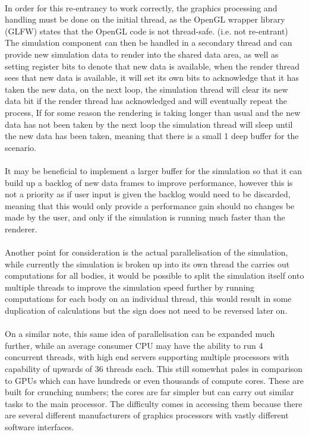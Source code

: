 \paragraph{}
In order for this re-entrancy to work correctly, the graphics processing and handling must be done on the initial thread, as the OpenGL wrapper library (GLFW) states that the OpenGL code is not thread-safe. (i.e. not re-entrant) The simulation component can then be handled in a secondary thread and can provide new simulation data to render into the shared data area, as well as setting register bits to denote that new data is available, when the render thread sees that new data is available, it will set its own bits to acknowledge that it has taken the new data, on the next loop, the simulation thread will clear its new data bit if the render thread has acknowledged and will eventually repeat the process, If for some reason the rendering is taking longer than usual and the new data has not been taken by the next loop the simulation thread will sleep until the new data has been taken, meaning that there is a small 1 deep buffer for the scenario.

\paragraph{}
It may be beneficial to implement a larger buffer for the simulation so that it can build up a backlog of new data frames to improve performance, however this is not a priority as if user input is given the backlog would need to be discarded, meaning that this would only provide a performance gain should no changes be made by the user, and only if the simulation is running much faster than the renderer.

\paragraph{}
Another point for consideration is the actual parallelisation of the simulation, while currently the simulation is broken up into its own thread the carries out computations for all bodies, it would be possible to split the simulation itself onto multiple threads to improve the simulation speed further by running computations for each body on an individual thread, this would result in some duplication of calculations but the sign does not need to be reversed later on.

\paragraph{}
On a similar note, this same idea of parallelisation can be expanded much further, while an average consumer CPU may have the ability to run 4 concurrent threads, with high end servers supporting multiple processors with capability of upwards of 36 threads each. This still somewhat pales in comparison to GPUs which can have hundreds or even thousands of compute cores. These are built for crunching numbers; the cores are far simpler but can carry out similar tasks to the main processor. The difficulty comes in accessing them because there are several different manufacturers of graphics processors with vastly different software interfaces. 

